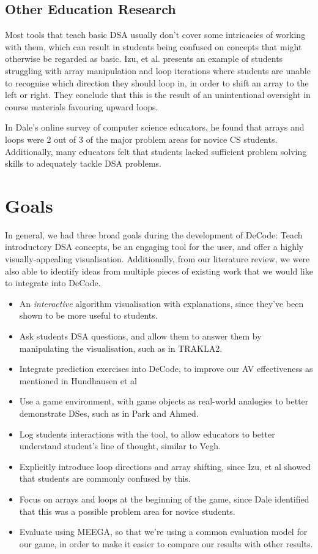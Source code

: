 \documentclass[11pt]{article}
\begin{document}
\subsection{Other Education Research}
Most tools that teach basic DSA usually don't cover some intricacies of working with them, which can result in students being confused on concepts that might otherwise be regarded as basic. Izu, et al.\cite{izuloop} presents an example of students struggling with array manipulation and loop iterations where students are unable to recognise which direction they should loop in, in order to shift an array to the left or right. They conclude that this is the result of an unintentional oversight in course materials favouring upward loops.\par
In Dale's online survey of computer science educators, he found that arrays and loops were 2 out of 3 of the major problem areas for novice CS students\cite{Dale:2006:MDT:1138403.1138432}. Additionally, many educators felt that students lacked sufficient problem solving skills to adequately tackle DSA problems.
\section{Goals}
In general, we had three broad goals during the development of DeCode: Teach introductory DSA concepts, be an engaging tool for the user, and offer a highly visually-appealing visualisation. Additionally, from our literature review, we were also able to identify ideas from multiple pieces of existing work that we would like to integrate into DeCode.
\begin{spacing}{1.5}
\begin{itemize}
  \item An \emph{interactive} algorithm visualisation with explanations, since they've been shown to be more useful to students\cite{vegh2}.
  \item Ask students DSA questions, and allow them to answer them by manipulating the visualisation, such as in TRAKLA2\cite{TRAKLA2}.
  \item Integrate prediction exercises into DeCode, to improve our AV effectiveness as mentioned in Hundhausen et al\cite{metaStudy}
  \item Use a game environment, with game objects as real-world analogies to better demonstrate DSes, such as in Park and Ahmed\cite{Park}.
  \item Log students interactions with the tool, to allow educators to better understand student's line of thought, similar to Vegh\cite{vegh}.
  \item Explicitly introduce loop directions and array shifting, since Izu, et al\cite{izuloop} showed that students are commonly confused by this.
  \item Focus on arrays and loops at the beginning of the game, since Dale\cite{Dale:2006:MDT:1138403.1138432} identified that this was a possible problem area for novice students.
  \item Evaluate using MEEGA\cite{meegaPlus}, so that we're using a common evaluation model for our game, in order to make it easier to compare our results with other results.
\end{itemize}
\end{spacing}
\end{document}
